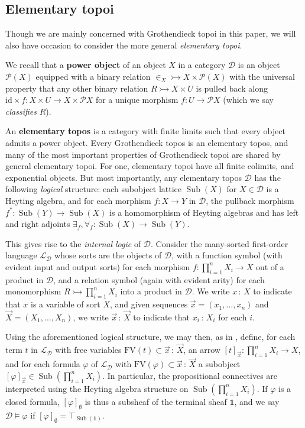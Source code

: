 \documentclass[11pt]{amsart}
\newcommand\cD{\mathcal{D}}
\newcommand\cL{\mathcal{L}}
\newcommand\defword[1]{\textbf{#1}}
\newcommand\FV{\mathrm{FV}}
\newcommand\id{\mathrm{id}}
\renewcommand\phi{\varphi}
\newcommand\pow{\mathcal{P}}
\newcommand\presem[1]{[{#1}]}
\newcommand\Sub{\operatorname{Sub}}
\newcommand\tm{\mathbf{1}}
\newcommand\tolon{{\,:\,}}
\newcommand\tto{\rightarrowtail}
\newcommand\vX{\vec{X}}
\newcommand\vx{\vec{x}}
\theoremstyle{definition}
\theoremstyle{remark}
\theoremstyle{plain}
\begin{document}
\subsection{Elementary topoi} \label{subsec:elementary-topoi}
Though we are mainly concerned with Grothendieck topoi in this paper, we will also have occasion to consider the more general \emph{elementary topoi}.

We recall that a \defword{power object} of an object \( X \) in a category \( \cD \) is an object \( \pow(X) \) equipped with a binary relation \( \in_X \tto X \times \pow(X) \) with the universal property that any other binary relation \( R \tto X \times U \) is pulled back along \( \id \times f \colon X \times U \to X \times \pow X \) for a unique morphism \( f \colon U \to \pow X \) (which we say \emph{classifies} \( R \)).

An \defword{elementary topos} is a category with finite limits such that every object admits a power object.
Every Grothendieck topos is an elementary topos, and many of the most important properties of Grothendieck topoi are shared by general elementary topoi.
For one, elementary topoi have all finite colimits, and exponential objects.
But most importantly, any elementary topos \( \cD \) has the following \emph{logical} structure: each subobject lattice \( \Sub(X) \) for \( X \in \cD \) is a Heyting algebra, and for each morphism \( f \colon X \to Y \) in \( \cD \), the pullback morphism \( f^* \colon \Sub(Y) \to \Sub(X) \) is a homomorphism of Heyting algebras and has left and right adjoints \( \exists_f,\forall_f \colon \Sub(X) \to \Sub(Y) \).

This gives rise to the \emph{internal logic} of \( \cD \).
Consider the many-sorted first-order language \( \cL_\cD \) whose sorts are the objects of \( \cD \), with a function symbol (with evident input and output sorts) for each morphism \( f \colon \prod_{i=1}^n X_i \to X \) out of a product in \( \cD \), and a relation symbol (again with evident arity) for each monomorphism \( R \tto \prod_{i=1}^n X_i \) into a product in \( \cD \).
We write \( x \tolon X \) to indicate that \( x \) is a variable of sort \( X \), and given sequences \( \vec{x} = (x_1,\ldots,x_n) \) and \( \vX = (X_1,\ldots,X_n) \), we write \( \vec{x} \tolon \vX \) to indicate that \( x_i \tolon X_i \) for each \( i \).

Using the aforementioned logical structure, we may then, as in \cite[Chapter~2]{makkai-reyes-focl}, define, for each term \( t \) in \( \cL_\cD \) with free variables \( \FV(t) \subset \vx \tolon \vX \), an arrow \( \presem{t}_{\vx} \colon \prod_{i=1}^n X_i \to X \), and for each formula \( \phi \) of \( \cL_\cD \) with \( \FV(\phi) \subset \vx \tolon \vX \) a subobject \( \presem{\phi}_{\vx} \in \Sub(\prod_{i=1}^n X_i) \).
In particular, the propositional connectives are interpreted using the Heyting algebra structure on \( \Sub(\prod_{i=1}^n X_i) \).
If \( \phi \) is a closed formula, \( \presem{\phi}_{\emptyset} \) is thus a subsheaf of the terminal sheaf \( \tm \), and we say \( \cD \vDash \phi \) if \( \presem{\phi}_{\emptyset} = \top_{\Sub(\tm)} \).
\end{document}
